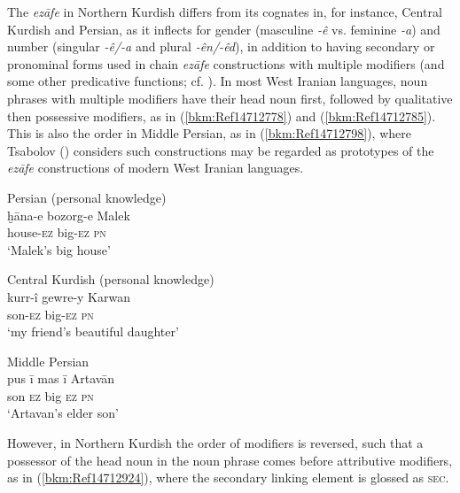 \documentclass[output=paper]{langsci/langscibook}
\begin{document}

The \textit{ezāfe} in Northern Kurdish differs from its cognates in, for instance, Central Kurdish and Persian, as it inflects for gender (masculine \textit{{}-ê} vs. feminine \textit{{}-a}) and number (singular \textit{{}-ê/-a} and plural \textit{{}-ên/-êd}), in addition to having secondary or pronominal forms used in chain \textit{ezāfe} constructions with multiple modifiers (and some other predicative functions; cf. \citealt{Haig2011,HaigÖpengin2018}). In most West Iranian languages, noun phrases with multiple modifiers have their head noun first, followed by qualitative then possessive modifiers, as in (\ref{bkm:Ref14712778}) and (\ref{bkm:Ref14712785}). This is also the order in Middle Persian, as in (\ref{bkm:Ref14712798}), where Tsabolov (\citeyear[122]{Tsabolov1994}) considers such constructions may be regarded as prototypes of the \textit{ezāfe} constructions of modern West Iranian languages. 

\ea\label{bkm:Ref14712778}Persian (personal knowledge)\\
\gll ḫāna-e bozorg-e Malek\\
     house-\textsc{ez} big-\textsc{ez} \textsc{pn}\\
\glt ‘Malek’s big house’
\z

\ea\label{bkm:Ref14712785}\label{bkm:Ref14771780}Central Kurdish  (personal knowledge)\\
\gll kurr-î gewre-y Karwan\\
     son-\textsc{ez} big-\textsc{ez} \textsc{pn}\\
\glt ‘my friend’s beautiful daughter’
\z

\ea\label{bkm:Ref14712798}Middle Persian \citep[122]{Tsabolov1994}\\
\gll pus ī mas ī Artavān\\
     son \textsc{ez} big \textsc{ez} \textsc{pn}\\
\glt ‘Artavan’s elder son’
\z

However, in Northern Kurdish the order of modifiers is reversed, such that a possessor of the head noun in the noun phrase comes before attributive modifiers, as in (\ref{bkm:Ref14712924}), where the secondary linking element is glossed as \textsc{sec}.  
\end{document}
